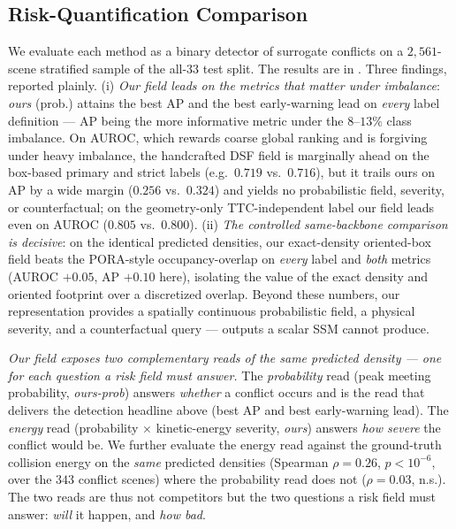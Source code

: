 \documentclass[journal]{IEEEtran}
\begin{document}
\subsection{Risk-Quantification Comparison}\label{sec:results_compare}
We evaluate each method as a binary detector of surrogate conflicts on a $2{,}561$-scene stratified sample of the all-33 test split. The results are in .
Three findings, reported plainly. 
(i) \emph{Our field leads on the metrics that matter under imbalance}: \emph{ours} (prob.) attains the best AP and the best early-warning lead on \emph{every} label definition --- AP being the more informative metric under the $8$--$13\%$ class imbalance. On AUROC, which rewards coarse global ranking and is forgiving under heavy imbalance, the handcrafted DSF field is marginally ahead on the box-based primary and strict labels (e.g.\ $0.719$ vs.\ $0.716$), but it trails ours on AP by a wide margin ($0.256$ vs.\ $0.324$) and yields no probabilistic field, severity, or counterfactual; on the geometry-only TTC-independent label our field leads even on AUROC ($0.805$ vs.\ $0.800$).
(ii) \emph{The controlled same-backbone comparison is decisive}: on the identical predicted densities, our exact-density oriented-box field beats the PORA-style occupancy-overlap on \emph{every} label and \emph{both} metrics (AUROC $+0.05$, AP $+0.10$ here), isolating the value of the exact density and oriented footprint over a discretized overlap. Beyond these numbers, our representation provides a spatially continuous probabilistic field, a physical severity, and a counterfactual query --- outputs a scalar SSM cannot produce. 

\emph{Our field exposes two complementary reads of the same predicted density --- one for each question a risk field must answer.} The \emph{probability} read (peak meeting probability, \emph{ours-prob}) answers \emph{whether} a conflict occurs and is the read that delivers the detection headline above (best AP and best early-warning lead). The \emph{energy} read (probability $\times$ kinetic-energy severity, \emph{ours}) answers \emph{how severe} the conflict would be. We further evaluate the energy read against the ground-truth collision energy on the \emph{same} predicted densities (Spearman $\rho{=}0.26$, $p{<}10^{-6}$, over the $343$ conflict scenes) where the probability read does not ($\rho{=}0.03$, n.s.). The two reads are thus not competitors but the two questions a risk field must answer: \emph{will} it happen, and \emph{how bad}. 
\end{document}
